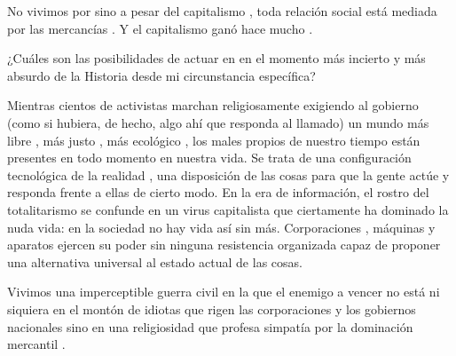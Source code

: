 No vivimos por sino a pesar del capitalismo , toda relación social está mediada por las mercancías . Y el capitalismo ganó hace mucho .

¿Cuáles son las posibilidades de actuar en en el momento más incierto  y más absurdo  de la Historia desde mi circunstancia específica?

Mientras cientos de activistas marchan religiosamente exigiendo al gobierno  (como si hubiera, de hecho, algo ahí que responda al llamado) un mundo más libre , más justo , más ecológico , los males propios de nuestro tiempo están presentes en todo momento en nuestra vida. Se trata de una configuración tecnológica de la realidad , una disposición de las cosas para que la gente actúe y responda frente a ellas de cierto modo. En la era de información, el rostro del totalitarismo se confunde en un virus capitalista  que ciertamente ha dominado la nuda vida: en la sociedad no hay vida así sin más. Corporaciones , máquinas  y aparatos ejercen su poder sin ninguna resistencia organizada capaz de proponer una alternativa universal al estado actual de las cosas.

Vivimos una imperceptible guerra civil  en la que el enemigo a vencer no está ni siquiera en el montón de idiotas que rigen las corporaciones y los gobiernos nacionales  sino en una religiosidad  que profesa simpatía por la dominación mercantil .
